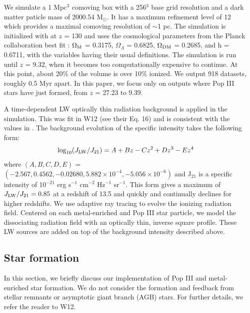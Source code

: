 \documentclass[a4paper,fleqn,usenatbib]{mnras}
\begin{document}
We simulate a 1 Mpc$^{3}$ comoving box with a 256$^{3}$ base grid 
resolution and a dark matter paticle mass of 2000.54 M$_{\odot}$. It has a maximum refinement level of 12 which provides a maximal comoving resolution of $\sim$1 pc. The simulation is 
initialized with \music{} \citep{Hahn11_MUSIC} at $z$ = 130 and uses the cosmological parameters from the Planck collaboration best fit 
\citet{Planck13_Cosmo}: $\Omega_{\rm M}$ = 0.3175, $\Omega_{\Lambda}$ = 
0.6825, $\Omega_{\rm DM}$ = 0.2685, and h = 0.6711, with the variables 
having their usual definitions. The simulation is run until $z$ = 9.32, when it becomes too computationally expensive to continue. At this point, about 20\% of the volume is over 10\% ionized. We output 918 datasets,  roughly 0.5 Myr apart. In this paper, we focus only on outputs where Pop III stars have just formed, from $z$ = 27.23 to 9.39. 

A time-dependent LW optically thin radiation background is applied in the simulation. This was fit in W12 (see their Eq. 16) and is consistent with the values in \citet{Trenti09_SFR}. The background evolution of the specific intensity takes the following form:
\begin{equation} \label{LWbg}
	\log_{10}(J_{\rm LW}/J_{21}) = A + Bz - Cz^{2} + Dz^{3} - Ez^{4}
\end{equation}
where $(A, B, C, D, E)$ = $(-2.567, 0.4562, - 0.02680, 5.882 \times 10^{-4}, - 5.056 \times 10^{-6})$ and J$_{21}$ is a specific intensity of 10$^{-21}$ erg s$^{-1}$ cm$^{-2}$ Hz$^{-1}$ sr$^{-1}$.  This form gives a maximum of $J_{\rm LW}/J_{21} = 0.85$ at a redshift of 13.5 and quickly and continually declines for higher redshifts. We use adaptive ray tracing \citep{Abel02_RT, Wise11_Moray} to evolve the ionizing radiation field. Centered on each metal-enriched and Pop III star particle, we model the \hh{} dissociating radiation field with an optically thin, inverse square profile. These LW sources are added on top of the background intensity described above.
\subsection{Star formation}
In this section, we briefly discuss our implementation of Pop III and metal-enriched star formation. We do not consider the formation and feedback from stellar remnants or asymptotic giant branch (AGB) stars. For further details, we refer the reader to W12. 
\end{document}
